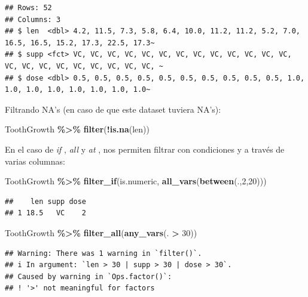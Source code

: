 \documentclass[
]{book}
\newenvironment{Shaded}{\begin{snugshade}}{\end{snugshade}}
\newcommand{\DecValTok}[1]{\textcolor[rgb]{0.00,0.00,0.81}{#1}}
\newcommand{\FunctionTok}[1]{\textcolor[rgb]{0.13,0.29,0.53}{\textbf{#1}}}
\newcommand{\NormalTok}[1]{#1}
\newcommand{\SpecialCharTok}[1]{\textcolor[rgb]{0.81,0.36,0.00}{\textbf{#1}}}
\begin{document}
\begin{verbatim}
## Rows: 52
## Columns: 3
## $ len  <dbl> 4.2, 11.5, 7.3, 5.8, 6.4, 10.0, 11.2, 11.2, 5.2, 7.0, 16.5, 16.5, 15.2, 17.3, 22.5, 17.3~
## $ supp <fct> VC, VC, VC, VC, VC, VC, VC, VC, VC, VC, VC, VC, VC, VC, VC, VC, VC, VC, VC, VC, VC, VC, ~
## $ dose <dbl> 0.5, 0.5, 0.5, 0.5, 0.5, 0.5, 0.5, 0.5, 0.5, 0.5, 1.0, 1.0, 1.0, 1.0, 1.0, 1.0, 1.0, 1.0~
\end{verbatim}

\hfill\break
Filtrando NA's (en caso de que este dataset tuviera NA's):

\begin{Shaded}
\begin{Highlighting}[]
\NormalTok{ToothGrowth }\SpecialCharTok{\%\textgreater{}\%} \FunctionTok{filter}\NormalTok{(}\SpecialCharTok{!}\FunctionTok{is.na}\NormalTok{(len))}
\end{Highlighting}
\end{Shaded}

\hfill\break
En el caso de \emph{if} , \emph{all} y \emph{at} , nos permiten filtrar con condiciones y a través de varias columnas:

\begin{Shaded}
\begin{Highlighting}[]
\NormalTok{ToothGrowth }\SpecialCharTok{\%\textgreater{}\%} \FunctionTok{filter\_if}\NormalTok{(is.numeric, }\FunctionTok{all\_vars}\NormalTok{(}\FunctionTok{between}\NormalTok{(.,}\DecValTok{2}\NormalTok{,}\DecValTok{20}\NormalTok{)))}
\end{Highlighting}
\end{Shaded}

\begin{verbatim}
##    len supp dose
## 1 18.5   VC    2
\end{verbatim}

\begin{Shaded}
\begin{Highlighting}[]
\NormalTok{ToothGrowth }\SpecialCharTok{\%\textgreater{}\%} \FunctionTok{filter\_all}\NormalTok{(}\FunctionTok{any\_vars}\NormalTok{(. }\SpecialCharTok{\textgreater{}} \DecValTok{30}\NormalTok{))}
\end{Highlighting}
\end{Shaded}

\begin{verbatim}
## Warning: There was 1 warning in `filter()`.
## i In argument: `len > 30 | supp > 30 | dose > 30`.
## Caused by warning in `Ops.factor()`:
## ! '>' not meaningful for factors
\end{verbatim}
\end{document}
